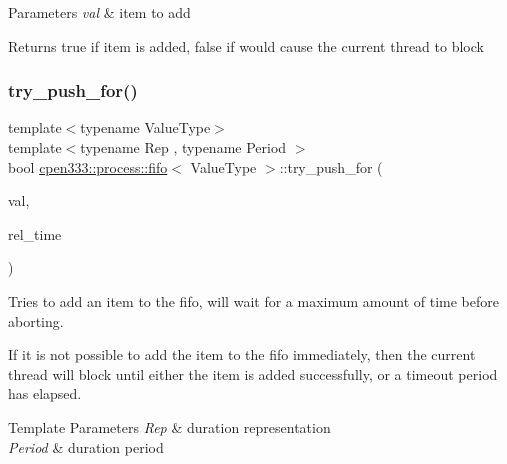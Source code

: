 \begin{DoxyParams}{Parameters}
{\em val} & item to add \\
\hline
\end{DoxyParams}
\begin{DoxyReturn}{Returns}
{\ttfamily true} if item is added, {\ttfamily false} if would cause the current thread to block 
\end{DoxyReturn}
\mbox{\label{classcpen333_1_1process_1_1fifo_a2904c1ed9d23f0d7fd034216c5509688}} 
\subsubsection{\texorpdfstring{try\+\_\+push\+\_\+for()}{try\_push\_for()}}
{\footnotesize\ttfamily template$<$typename Value\+Type$>$ \\
template$<$typename Rep , typename Period $>$ \\
bool \hyperlink{classcpen333_1_1process_1_1fifo}{cpen333\+::process\+::fifo}$<$ Value\+Type $>$\+::try\+\_\+push\+\_\+for (\begin{DoxyParamCaption}\item[{const Value\+Type \&}]{val,  }\item[{std\+::chrono\+::duration$<$ Rep, Period $>$ \&}]{rel\+\_\+time }\end{DoxyParamCaption})\hspace{0.3cm}{\ttfamily [inline]}}



Tries to add an item to the fifo, will wait for a maximum amount of time before aborting. 

If it is not possible to add the item to the fifo immediately, then the current thread will block until either the item is added successfully, or a timeout period has elapsed.


\begin{DoxyTemplParams}{Template Parameters}
{\em Rep} & duration representation \\
\hline
{\em Period} & duration period \\
\hline
\end{DoxyTemplParams}

